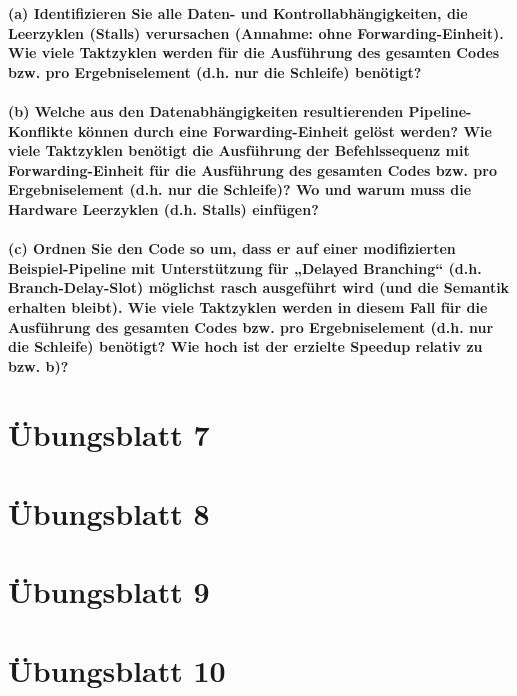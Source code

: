\documentclass[11pt]{article}
\begin{document}
    \textbf{(a) Identifizieren Sie alle Daten- und Kontrollabhängigkeiten, die Leerzyklen (Stalls)
    verursachen (Annahme: ohne Forwarding-Einheit). Wie viele Taktzyklen werden für die
    Ausführung des gesamten Codes bzw. pro Ergebniselement (d.h. nur die Schleife)
    benötigt?\\\\
    (b) Welche aus den Datenabhängigkeiten resultierenden Pipeline-Konflikte können durch
    eine Forwarding-Einheit gelöst werden? Wie viele Taktzyklen benötigt die Ausführung der
    Befehlssequenz mit Forwarding-Einheit für die Ausführung des gesamten Codes bzw. pro
    Ergebniselement (d.h. nur die Schleife)? Wo und warum muss die Hardware Leerzyklen
    (d.h. Stalls) einfügen?\\\\
    (c) Ordnen Sie den Code so um, dass er auf einer modifizierten Beispiel-Pipeline mit
    Unterstützung für „Delayed Branching“ (d.h. Branch-Delay-Slot) möglichst rasch
    ausgeführt wird (und die Semantik erhalten bleibt). Wie viele Taktzyklen werden in diesem
    Fall für die Ausführung des gesamten Codes bzw. pro Ergebniselement (d.h. nur die
    Schleife) benötigt? Wie hoch ist der erzielte Speedup relativ zu bzw. b)?}




\section{Übungsblatt 7}


\section{Übungsblatt 8}



\section{Übungsblatt 9}


\section{Übungsblatt 10}

    
\end{document}
